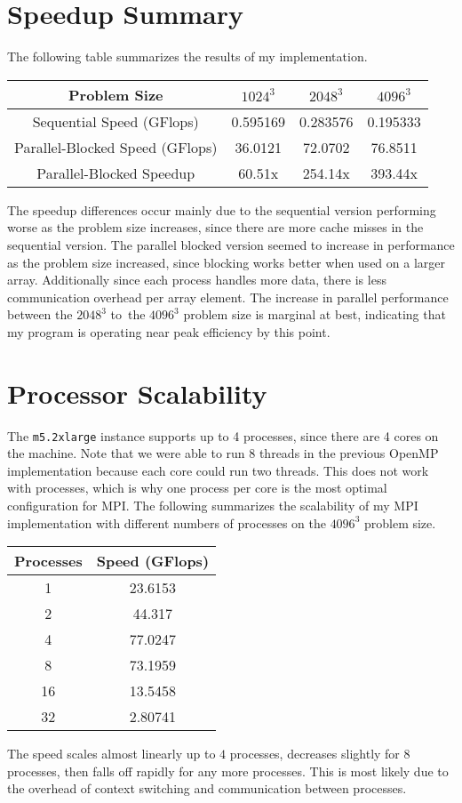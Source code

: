 \documentclass[12pt]{article}
\begin{document}
\section{Speedup Summary}

The following table summarizes the results of my implementation.
\begin{center}
    \begin{tabular}{c|c|c|c}
        Problem Size & \(1024^3\) & \(2048^3\) & \(4096^3\)\\
        \hline
        Sequential Speed (GFlops) & 0.595169 & 0.283576 & 0.195333\\
        Parallel-Blocked Speed (GFlops)& 36.0121 & 72.0702 & 76.8511\\
        Parallel-Blocked Speedup & 60.51x & 254.14x & 393.44x
    \end{tabular}
\end{center}
The speedup differences occur mainly due to the sequential version performing
worse as the problem size increases, since there are more cache misses in the
sequential version. The parallel blocked version seemed to increase in
performance as the problem size increased, since blocking works better when
used on a larger array. Additionally since each process handles more data, there
is less communication overhead per array element. The increase in parallel performance
between the \(2048^3\) to\ the \(4096^3\) problem size is marginal at best, indicating
that my program is operating near peak efficiency by this point.

\section{Processor Scalability}

The \texttt{m5.2xlarge} instance supports up to 4 processes, since there are 4 cores on the machine.
Note that we were able to run 8 threads in the previous OpenMP implementation because each core could
run two threads. This does not work with processes, which is why one process per core is the most optimal
configuration for MPI. The following summarizes the scalability of my MPI implementation with different
numbers of processes on the \(4096^3\) problem size.
\begin{center}
    \begin{tabular} {c|c}
        Processes & Speed (GFlops)\\
        \hline
        1 & 23.6153\\
        2 & 44.317\\
        4 & 77.0247\\
        8 & 73.1959\\
        16 & 13.5458\\
        32 & 2.80741
    \end{tabular}
\end{center}
The speed scales almost linearly up to \(4\) processes, decreases slightly for \(8\) processes, then falls
off rapidly for any more processes. This is most likely due to the overhead of context switching and communication
between processes.
\end{document}

